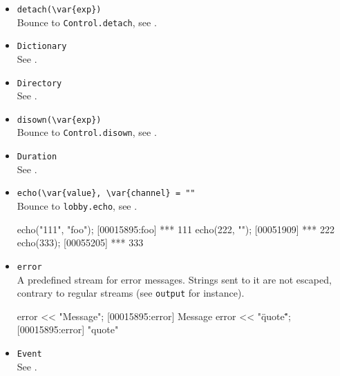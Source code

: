 \begin{itemize}
\item \lstinline|detach(\var{exp})|\\
  Bounce to \lstinline|Control.detach|, see .

\item \lstinline|Dictionary|\\
  See .

\item \lstinline|Directory|\\
  See .

\item \lstinline|disown(\var{exp})|\\
  Bounce to \lstinline|Control.disown|, see .

\item \lstinline|Duration|\\
  See .

\item \lstinline|echo(\var{value}, \var{channel} = ""|\\
  Bounce to \lstinline|lobby.echo|, see .
\begin{urbiscript}[firstnumber=last]
echo("111", "foo");
[00015895:foo] *** 111
echo(222, "");
[00051909] *** 222
echo(333);
[00055205] *** 333
\end{urbiscript}

\item \lstinline|error|\\
  A predefined stream for error messages.  Strings sent to it are not
  escaped, contrary to regular streams (see \lstinline|output| for
  instance).
\begin{urbiscript}[firstnumber=last]
error << "Message";
[00015895:error] Message
error << "\"quote\"";
[00015895:error] "quote"
\end{urbiscript}


\item \lstinline|Event|\\
  See .


\end{itemize}
